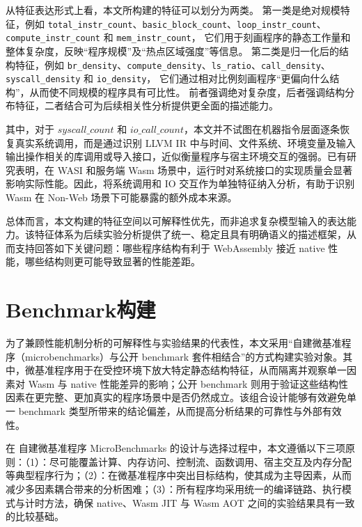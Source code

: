 从特征表达形式上看，本文所构建的特征可以划分为两类。
第一类是绝对规模特征，例如
\texttt{total\_instr\_count}、\texttt{basic\_block\_count}、\texttt{loop\_instr\_count}、
\texttt{compute\_instr\_count} 和 \texttt{mem\_instr\_count}，
它们用于刻画程序的静态工作量和整体复杂度，反映“程序规模”及“热点区域强度”等信息。
第二类是归一化后的结构特征，例如
\texttt{br\_density}、\texttt{compute\_density}、\texttt{ls\_ratio}、\texttt{call\_density}、
\texttt{syscall\_density} 和 \texttt{io\_density}，
它们通过相对比例刻画程序“更偏向什么结构”，从而使不同规模的程序具有可比性。
前者强调绝对复杂度，后者强调结构分布特征，二者结合可为后续相关性分析提供更全面的描述能力。

其中，对于 $syscall\_count$ 和 $io\_call\_count$，本文并不试图在机器指令层面逐条恢复真实系统调用，而是通过识别 LLVM IR 中与时间、文件系统、环境变量及输入输出操作相关的库调用或导入接口，近似衡量程序与宿主环境交互的强弱。已有研究表明，在 WASI 和服务端 Wasm 场景中，运行时对系统接口的实现质量会显著影响实际性能\cite{mao2024ewapa}。因此，将系统调用和 IO 交互作为单独特征纳入分析，有助于识别 Wasm 在 Non-Web 场景下可能暴露的额外成本来源。

总体而言，本文构建的特征空间以可解释性优先，而非追求复杂模型输入的表达能力。该特征体系为后续实验分析提供了统一、稳定且具有明确语义的描述框架，从而支持回答如下关键问题：哪些程序结构有利于 WebAssembly 接近 native 性能，哪些结构则更可能导致显著的性能差距。


\section{Benchmark构建}

为了兼顾性能机制分析的可解释性与实验结果的代表性，本文采用“自建微基准程序（microbenchmarks）与公开 benchmark 套件相结合”的方式构建实验对象。其中，微基准程序用于在受控环境下放大特定静态结构特征，从而隔离并观察单一因素对 Wasm 与 native 性能差异的影响；公开 benchmark 则用于验证这些结构性因素在更完整、更加真实的程序场景中是否仍然成立。该组合设计能够有效避免单一 benchmark 类型所带来的结论偏差，从而提高分析结果的可靠性与外部有效性。

在 自建微基准程序 MicroBenchmarks 的设计与选择过程中，本文遵循以下三项原则：（1）：尽可能覆盖计算、内存访问、控制流、函数调用、宿主交互及内存分配等典型程序行为；（2）：在微基准程序中突出目标结构，使其成为主导因素，从而减少多因素耦合带来的分析困难；（3）：所有程序均采用统一的编译链路、执行模式与计时方法，确保 native、Wasm JIT 与 Wasm AOT 之间的实验结果具有一致的比较基础。

